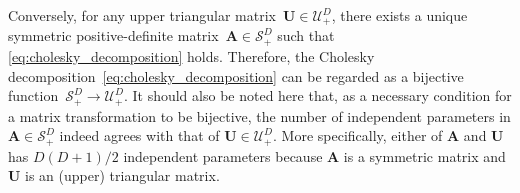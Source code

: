 \documentclass[12pt,a4paper]{article}
\begin{document}
Conversely, for any upper triangular matrix~$\mathbf{U} \in \mathcal{U}_{+}^{D}$,
there exists a unique symmetric positive-definite matrix~$\mathbf{A} \in \mathcal{S}_{+}^{D}$
such that \eqref{eq:cholesky_decomposition} holds.
Therefore, the Cholesky decomposition~\eqref{eq:cholesky_decomposition} can be regarded as
a bijective function~$\mathcal{S}_{+}^{D} \to \mathcal{U}_{+}^{D}$.
It should also be noted here that,
as a necessary condition for a matrix transformation to be bijective,
the number of independent parameters in $\mathbf{A} \in \mathcal{S}_{+}^{D}$
indeed agrees with that of $\mathbf{U} \in \mathcal{U}_{+}^{D}$.
More specifically, either of $\mathbf{A}$ and $\mathbf{U}$ has $D(D + 1)/2$ independent parameters
because $\mathbf{A}$ is a symmetric matrix and $\mathbf{U}$ is an (upper) triangular matrix.
\end{document}
